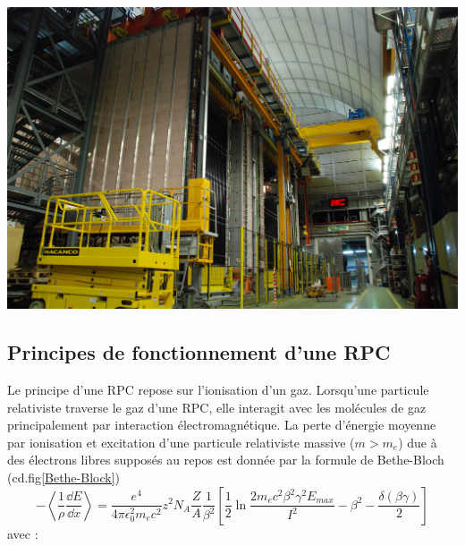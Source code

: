 \marginpar
{
	\centering
	\includegraphics[width=\marginparwidth]{RPC/OPERA.jpg}
	\label{opera}
}

\subsection{Principes de fonctionnement d'une RPC}
Le principe d'une RPC repose sur l'ionisation d'un gaz. Lorsqu'une particule relativiste traverse le gaz d'une RPC, elle interagit avec les molécules de gaz principalement par interaction électromagnétique. La perte d'énergie moyenne par ionisation et excitation d'une particule relativiste massive ($m>m_{e}$) due à des électrons libres supposés au repos est donnée par la formule de Bethe-Bloch (cd.fig\ref{Bethe-Block})
\begin{equation}
-\left<\frac{1}{\rho}\frac{\dd E}{\dd x}\right>=\frac{e^{4}}{4\pi \epsilon_{0}^{2}m_{e}c^{2}}z^{2}N_{A}\frac{Z}{A}\frac{1}{\beta^{2}}\left[\frac{1}{2}\ln\frac{2m_{e}c^{2}\beta^{2}\gamma^{2}E_{max}}{I^{2}}-\beta^{2}-\frac{\delta(\beta\gamma)}{2}\right]
\end{equation}
avec :

